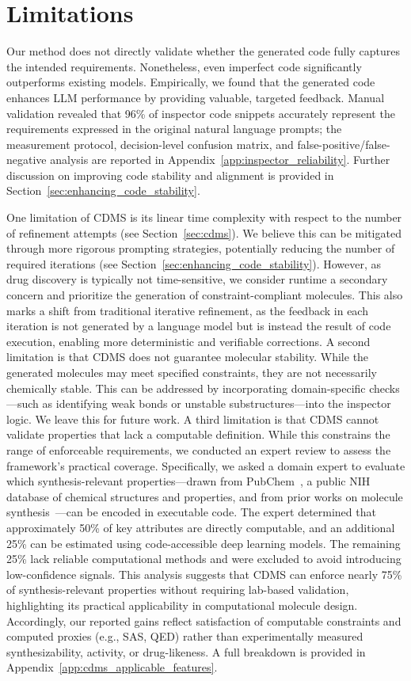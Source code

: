 \documentclass[10pt]{article} %
\begin{document}
\section{Limitations}
Our method does not directly validate whether the generated code fully captures the intended requirements. Nonetheless, even imperfect code significantly outperforms existing models. Empirically, we found that the generated code enhances LLM performance by providing valuable, targeted feedback. Manual validation revealed that 96\% of inspector code snippets accurately represent the requirements expressed in the original natural language prompts; the measurement protocol, decision-level confusion matrix, and false-positive/false-negative analysis are reported in Appendix~\ref{app:inspector_reliability}. Further discussion on improving code stability and alignment is provided in Section~\ref{sec:enhancing_code_stability}.

One limitation of CDMS is its linear time complexity with respect to the number of refinement attempts (see Section~\ref{sec:cdms}). We believe this can be mitigated through more rigorous prompting strategies, potentially reducing the number of required iterations (see Section~\ref{sec:enhancing_code_stability}). However, as drug discovery is typically not time-sensitive, we consider runtime a secondary concern and prioritize the generation of constraint-compliant molecules. This also marks a shift from traditional iterative refinement, as the feedback in each iteration is not generated by a language model but is instead the result of code execution, enabling more deterministic and verifiable corrections.
A second limitation is that CDMS does not guarantee molecular stability. While the generated molecules may meet specified constraints, they are not necessarily chemically stable. This can be addressed by incorporating domain-specific checks—such as identifying weak bonds or unstable substructures—into the inspector logic. We leave this for future work.
A third limitation is that CDMS cannot validate properties that lack a computable definition. While this constrains the range of enforceable requirements, we conducted an expert review to assess the framework’s practical coverage. Specifically, we asked a domain expert to evaluate which synthesis-relevant properties—drawn from PubChem~\cite{kim2023pubchem}, a public NIH database of chemical structures and properties, and from prior works on molecule synthesis~\cite{fu2021mimosa, pei2024biot5+}—can be encoded in executable code. The expert determined that approximately 50\% of key attributes are directly computable, and an additional 25\% can be estimated using code-accessible deep learning models. The remaining 25\% lack reliable computational methods and were excluded to avoid introducing low-confidence signals. This analysis suggests that CDMS can enforce nearly 75\% of synthesis-relevant properties without requiring lab-based validation, highlighting its practical applicability in computational molecule design. Accordingly, our reported gains reflect satisfaction of computable constraints and computed proxies (e.g., SAS, QED) rather than experimentally measured synthesizability, activity, or drug-likeness. A full breakdown is provided in Appendix~\ref{app:cdms_applicable_features}.
\end{document}
